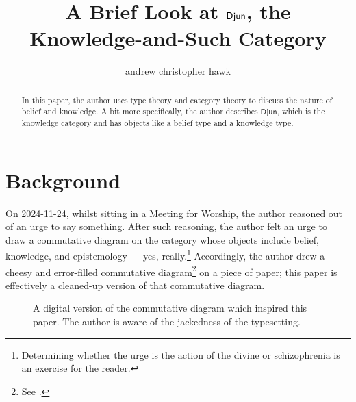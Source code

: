 \documentclass{article}
\title{A Brief Look at \(\category{Djun}\), the Knowledge-and-Such Category}
\author{andrew christopher hawk}
\newcommand{\category}[1]{\mathsf{#1}}
\begin{document}
\maketitle{}

\begin{abstract}
In this paper, the author uses type theory and category theory to discuss the nature of belief and knowledge.  A bit more specifically, the author describes \(\category{Djun}\), which is the knowledge category and has objects like a belief type and a knowledge type.
\end{abstract}

\section{Background}
On 2024-11-24, whilst sitting in a Meeting for Worship, the author reasoned out of an urge to say something.  After such reasoning, the author felt an urge to draw a commutative diagram on the category whose objects include belief, knowledge, and epistemology --- yes, really.\footnote{Determining whether the urge is the action of the divine or schizophrenia is an exercise for the reader.}  Accordingly, the author drew a cheesy and error-filled commutative diagram\footnote{See .} on a piece of paper; this paper is effectively a cleaned-up version of that commutative diagram.

\begin{figure}
  \caption{A digital version of the commutative diagram which inspired this paper.  The author is aware of the jackedness of the typesetting.}\label{fig:originalDiagram}
\end{figure}
\end{document}
